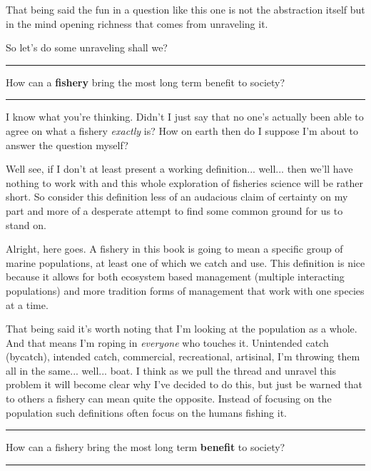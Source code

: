\documentclass[11pt,a5paper]{book}
\begin{document}
That being said the fun in a question like this one is not the abstraction itself but in the mind opening richness that comes from unraveling it.
\newline

So let's do some unraveling shall we? 
\newpage

\noindent \rule{\textwidth}{0.5pt} 
\noindent How can a \textbf{fishery} bring the most long term benefit to society?
\newline
\rule{\textwidth}{0.5pt} 
\vspace{5pt}

I know what you're thinking. Didn't I just say that no one's actually been able to agree on what a fishery \textit{exactly} is? How on earth then do I suppose I'm about to answer the question myself? 
\newline

Well see, if I don't at least present a working definition... well... then we'll have nothing to work with and this whole exploration of fisheries science will be rather short. So consider this definition less of an audacious claim of certainty on my part and more of a desperate attempt to find some common ground for us to stand on. 
\newline

Alright, here goes. A fishery in this book is going to mean a specific group of marine populations, at least one of which we catch and use. This definition is nice because it allows for both ecosystem based management (multiple interacting populations) and more tradition forms of management that work with one species at a time. 
\newline

That being said it's worth noting that I'm looking at the population as a whole. And that means I'm roping in \textit{everyone} who touches it. Unintended catch (bycatch), intended catch, commercial, recreational, artisinal, I'm throwing them all in the same... well... boat. I think as we pull the thread and unravel this problem it will become clear why I've decided to do this, but just be warned that to others a fishery can mean quite the opposite. Instead of focusing on the population such definitions often focus on the humans fishing it. 
\newpage

\noindent \rule{\textwidth}{0.5pt} 
\noindent How can a fishery bring the most long term \textbf{benefit} to society?
\newline
\rule{\textwidth}{0.5pt} 
\vspace{5pt}
\end{document}

